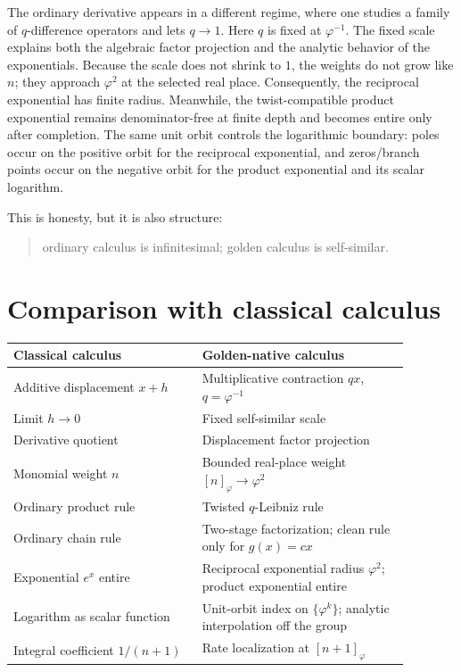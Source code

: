 \documentclass[11pt]{article}
\newcommand{\ph}{\varphi}
\begin{document}
The ordinary derivative appears in a different regime, where one studies a family of $q$-difference operators and lets $q\to1$.  Here $q$ is fixed at $\ph^{-1}$.  The fixed scale explains both the algebraic factor projection and the analytic behavior of the exponentials.  Because the scale does not shrink to $1$, the weights do not grow like $n$; they approach $\ph^2$ at the selected real place.  Consequently, the reciprocal exponential has finite radius.  Meanwhile, the twist-compatible product exponential remains denominator-free at finite depth and becomes entire only after completion.  The same unit orbit controls the logarithmic boundary: poles occur on the positive orbit for the reciprocal exponential, and zeros/branch points occur on the negative orbit for the product exponential and its scalar logarithm.

This is honesty, but it is also structure:
\begin{quote}
ordinary calculus is infinitesimal; golden calculus is self-similar.
\end{quote}

\section{Comparison with classical calculus}

\begin{center}
\small
\begin{tabular}{p{0.42\linewidth}p{0.46\linewidth}}
\toprule
Classical calculus & Golden-native calculus \\
\midrule
Additive displacement $x+h$ & Multiplicative contraction $qx$, $q=\ph^{-1}$ \\
Limit $h\to0$ & Fixed self-similar scale \\
Derivative quotient & Displacement factor projection \\
Monomial weight $n$ & Bounded real-place weight $[n]_{\ph}\to\ph^2$ \\
Ordinary product rule & Twisted $q$-Leibniz rule \\
Ordinary chain rule & Two-stage factorization; clean rule only for $g(x)=cx$ \\
Exponential $e^x$ entire & Reciprocal exponential radius $\ph^2$; product exponential entire \\
Logarithm as scalar function & Unit-orbit index on $\{\ph^k\}$; analytic interpolation off the group \\
Integral coefficient $1/(n+1)$ & Rate localization at $[n+1]_{\ph}$ \\
\bottomrule
\end{tabular}
\end{center}
\end{document}
